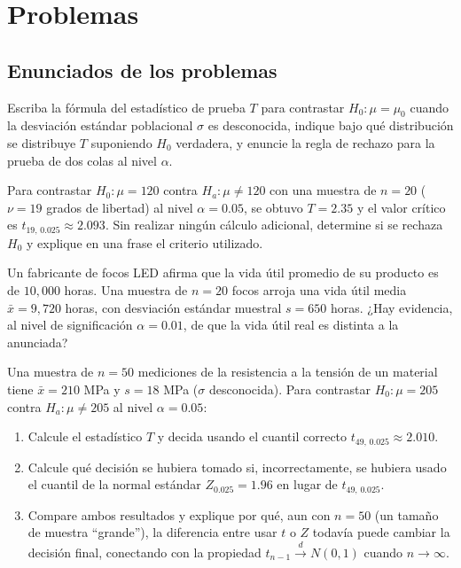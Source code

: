\section*{Problemas}

\subsection*{Enunciados de los problemas}

\begin{problema}
	\label{prob:b3d462b}
	Escriba la fórmula del estadístico de prueba $T$ para contrastar $H_0: \mu = \mu_0$ cuando la desviación estándar poblacional $\sigma$ es desconocida, indique bajo qué distribución se distribuye $T$ suponiendo $H_0$ verdadera, y enuncie la regla de rechazo para la prueba de dos colas al nivel $\alpha$.
\end{problema}

\begin{problema}
	\label{prob:313cd70}
	Para contrastar $H_0: \mu = 120$ contra $H_a: \mu \neq 120$ con una muestra de $n = 20$ ($\nu = 19$ grados de libertad) al nivel $\alpha = 0.05$, se obtuvo $T = 2.35$ y el valor crítico es $t_{19,\,0.025} \approx 2.093$. Sin realizar ningún cálculo adicional, determine si se rechaza $H_0$ y explique en una frase el criterio utilizado.
\end{problema}

\begin{problema}
	\label{prob:50f5282}
	Un fabricante de focos LED afirma que la vida útil promedio de su producto es de $10{,}000$ horas. Una muestra de $n = 20$ focos arroja una vida útil media $\bar{x} = 9{,}720$ horas, con desviación estándar muestral $s = 650$ horas. ¿Hay evidencia, al nivel de significación $\alpha = 0.01$, de que la vida útil real es distinta a la anunciada?
\end{problema}

\begin{problema}
	\label{prob:8d10618}
	Una muestra de $n = 50$ mediciones de la resistencia a la tensión de un material tiene $\bar{x} = 210$ MPa y $s = 18$ MPa ($\sigma$ desconocida). Para contrastar $H_0: \mu = 205$ contra $H_a: \mu \neq 205$ al nivel $\alpha = 0.05$:
	\begin{enumerate}
		\item Calcule el estadístico $T$ y decida usando el cuantil correcto $t_{49,\,0.025} \approx 2.010$.
		\item Calcule qué decisión se hubiera tomado si, incorrectamente, se hubiera usado el cuantil de la normal estándar $Z_{0.025} = 1.96$ en lugar de $t_{49,\,0.025}$.
		\item Compare ambos resultados y explique por qué, aun con $n = 50$ (un tamaño de muestra ``grande''), la diferencia entre usar $t$ o $Z$ todavía puede cambiar la decisión final, conectando con la propiedad $t_{n-1} \xrightarrow{d} N(0,1)$ cuando $n \to \infty$.
	\end{enumerate}
\end{problema}

